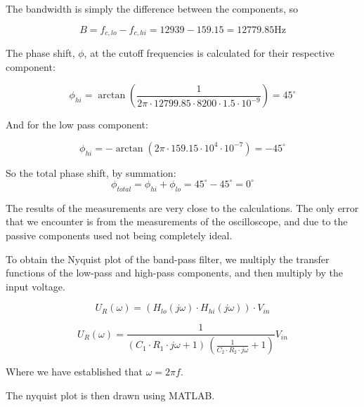The bandwidth is simply the difference between the components, so

\begin{equation}
    B = f_{c,lo} - f_{c, hi} = 12939 - 159.15 = 12779.85\text{Hz}
\end{equation}


The phase shift, $\phi$, at the cutoff frequencies is calculated for their respective component:

\begin{equation}
    \phi_{hi}=\arctan\left(\frac{1}{2\pi\cdot12799.85 \cdot 8200 \cdot 1.5 \cdot 10^{-9}}\right) = 45^{\circ}
\end{equation}

And for the low pass component:

\begin{equation}
    \phi_{hi}=-\arctan\left(2\pi \cdot 159.15 \cdot 10^4 \cdot 10^{-7}\right) = -45^{\circ}
\end{equation}

So the total phase shift, by summation:
\begin{equation}
    \phi_{total} = \phi_{hi} + \phi_{lo} = 45^{\circ} - 45^{\circ} = 0^{\circ}
\end{equation}

The results of the measurements are very close to the calculations. The only error that we encounter is from the measurements of the oscilloscope, and due to the passive components used not being completely ideal.


To obtain the Nyquist plot of the band-pass filter, we multiply the transfer functions of the low-pass and high-pass components, and then multiply by the input voltage.

\begin{equation}
    U_R(\omega) = (H_{lo}(j\omega) \cdot H_{hi}(j\omega)) \cdot V_{in}
\end{equation}

\begin{equation}
    U_R(\omega) = \frac{1}{\left(C_1 \cdot R_1 \cdot j\omega+1\right)\,\left(\frac{1}{C_2 \cdot R_{2} \cdot j\omega}+1\right)}V_{in}
\end{equation}

Where we have established that $\omega = 2\pi f$.

The nyquist plot is then drawn using MATLAB.

